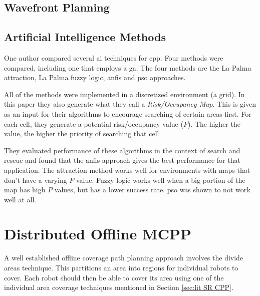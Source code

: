 \subsection{Wavefront Planning}
\subsection{Artificial Intelligence Methods}
One author compared several \ac{ai} techniques for \ac{cpp}. Four methods were compared, including one that employs a \ac{ga}. The four methods are the La Palma attraction, La Palma fuzzy logic, \ac{anfis} and \ac{pso} approaches. \cite{Juan2018}

All of the methods were implemented in a discretized environment (a grid). In this paper they also generate what they call a \emph{Risk/Occupancy Map}. This is given as an input for their algorithms to encourage searching of certain areas first. For each cell, they generate a potential risk/occupancy value ($P$). The higher the value, the higher the priority of searching that cell.

They evaluated performance of these algorithms in the context of search and rescue and found that the \ac{anfis} approach gives the best performance for that application. The attraction method works well for environments with maps that don't have a varying $P$ value. Fuzzy logic works well when a big portion of the map has high $P$ values, but has a lower success rate. \ac{pso} was shown to not work well at all.
\section{Distributed Offline MCPP}
\label{sec:lit Ditributed MCPP}
A well established offline coverage path planning approach involves the divide areas technique. This partitions an area into regions for individual robots to cover. Each robot should then be able to cover its area using one of the individual area coverage techniques mentioned in Section \ref{sec:lit SR CPP}.
